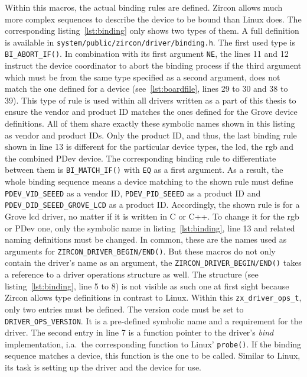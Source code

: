 Within this macros, the actual binding rules are defined.
Zircon allows much more complex sequences to describe the device to be bound than Linux does.
The corresponding listing~\ref{lst:binding} only shows two types of them.
A full definition is available in \texttt{system/public/zircon/driver/binding.h}.
The first used type is \texttt{BI_ABORT_IF()}.
In combination with its first argument \texttt{NE}, the lines 11 and 12 instruct the device coordinator to abort the binding process if the third argument which must be from the same type specified as a second argument, does not match the one defined for a device (see~\ref{lst:boardfile}, lines 29 to 30 and 38 to 39).
This type of rule is used within all drivers written as a part of this thesis to ensure the vendor and product ID matches the ones defined for the Grove device definitions.
All of them share exactly these symbolic names shown in this listing as vendor and product IDs.
Only the product ID, and thus, the last binding rule shown in line 13 is different for the particular device types, the \ac{lcd}, the \ac{rgb} and the combined PDev device.
The corresponding binding rule to differentiate between them is \texttt{BI_MATCH_IF()} with \texttt{EQ} as a first argument.
As a result, the whole binding sequence means a device matching to the shown rule must define \texttt{PDEV\_VID\_SEEED} as a vendor ID, \texttt{PDEV\_PID\_SEEED} as a product ID and \texttt{PDEV\_DID\_SEEED\_GROVE\_LCD} as a product ID.
Accordingly, the shown rule is for a Grove \ac{lcd} driver, no matter if it is written in C or C++.
To change it for the \ac{rgb} or PDev one, only the symbolic name in listing~\ref{lst:binding}, line 13 and related naming definitions must be changed.
In common, these are the names used as arguments for \texttt{ZIRCON_DRIVER_BEGIN/END()}.
But these macros do not only contain the driver's name as an argument, the \texttt{ZIRCON_DRIVER_BEGIN/END()} takes a reference to a driver operations structure as well.
The structure (see listing~\ref{lst:binding}, line 5 to 8) is not visible as such one at first sight because Zircon allows type definitions in contrast to Linux.
Within this \texttt{zx_driver_ops_t}, only two entries must be defined.
The version code must be set to \texttt{DRIVER_OPS_VERSION}.
It is a pre-defined symbolic name and a requirement for the driver.
The second entry in line 7 is a function pointer to the driver's \textit{bind} implementation, i.a.\ the corresponding function to Linux' \texttt{probe()}.
If the binding sequence matches a device, this function is the one to be called.
Similar to Linux, its task is setting up the driver and the device for use.

